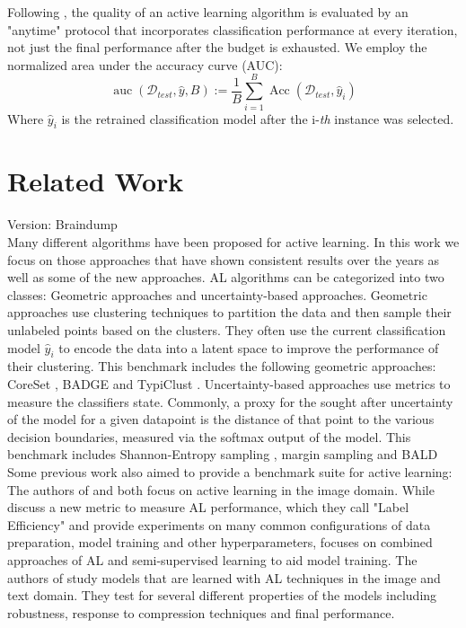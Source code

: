 \documentclass[]{article}
\begin{document}
%
Following \cite{zhou2021towards}, the quality of an active learning algorithm is evaluated by an "anytime" protocol that incorporates classification performance at every iteration, not just the final performance after the budget is exhausted.
We employ the normalized area under the accuracy curve (AUC):
\begin{equation}\label{eq:auc}
	\operatorname{auc}(\mathcal{D}_{test}, \hat y, B) := \frac{1}{B} \sum_{i=1}^{B} \operatorname{Acc}(\mathcal{D}_{test}, \hat y_i)
\end{equation}
Where $\hat y_i$ is the retrained classification model after the i-\textit{th} instance was selected.



\section{Related Work}
{\color{red} Version: Braindump}\\
Many different algorithms have been proposed for active learning. 
In this work we focus on those approaches that have shown consistent results over the years as well as some of the new approaches.
AL algorithms can be categorized into two classes: Geometric approaches and uncertainty-based approaches.
Geometric approaches use clustering techniques to partition the data and then sample their unlabeled points based on the clusters.
They often use the current classification model $\hat y_i$ to encode the data into a latent space to improve the performance of their clustering.
This benchmark includes the following geometric approaches: CoreSet \cite{sener2017active}, BADGE \cite{ashdeep} and TypiClust \cite{hacohen2022active}.
Uncertainty-based approaches use metrics to measure the classifiers state.
Commonly, a proxy for the sought after uncertainty of the model for a given datapoint is the distance of that point to the various decision boundaries, measured via the softmax output of the model.
This benchmark includes Shannon-Entropy sampling \cite{wang2014new}, margin sampling \cite{wang2014new} and BALD \cite{kirsch2019batchbald} \\ [1mm]
%
Some previous work also aimed to provide a benchmark suite for active learning:
The authors of \cite{beck2021effective} and \cite{li2022empirical} both focus on active learning in the image domain.
While \cite{beck2021effective} discuss a new metric to measure AL performance, which they call "Label Efficiency" and provide experiments on many common configurations of data preparation, model training and other hyperparameters, \cite{li2022empirical} focuses on combined approaches of AL and semi-supervised learning to aid model training.
The authors of \cite{hu2021towards} study models that are learned with AL techniques in the image and text domain.
They test for several different properties of the models including robustness, response to compression techniques and final performance.
\end{document}
